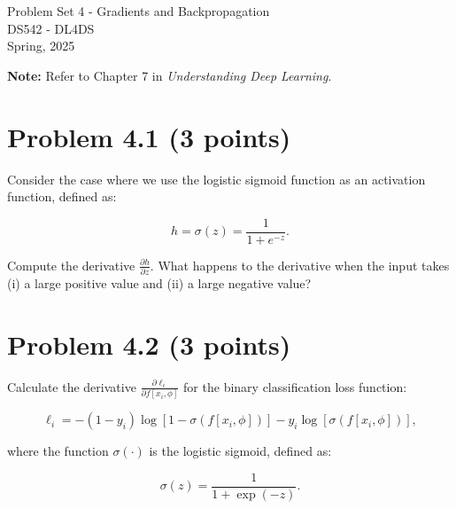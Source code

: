\documentclass[10pt]{article}
\begin{document}
\begin{center}
    \LARGE {Problem Set 4 - Gradients and Backpropagation} \\[1em]
    \Large{DS542 - DL4DS} \\[0.5em]
    \large Spring, 2025
\end{center}

\vspace{2em}

\noindent\textbf{Note:} Refer to Chapter 7 in \textit{Understanding Deep Learning}.

\vspace{2em}

\section*{Problem 4.1 (3 points)}

Consider the case where we use the logistic sigmoid function as an activation function, defined as:

\begin{equation}
h = \sigma(z) = \frac{1}{1 + e^{-z}}.
\end{equation}

\noindent Compute the derivative \( \frac{\partial h}{\partial z} \). What happens
to the derivative when the input takes (i) a large positive value and (ii) a large negative value?

\vspace{5em}

\section*{Problem 4.2 (3 points)}

Calculate the derivative \( \frac{\partial \ell_i}{\partial f[x_i, \phi]} \) for the binary 
classification loss function:

\begin{equation}
\ell_i = -(1 - y_i) \log [1 - \sigma(f[x_i, \phi])] - y_i \log [\sigma(f[x_i, \phi])],
\end{equation}

where the function \( \sigma(\cdot) \) is the logistic sigmoid, defined as:

\begin{equation}
\sigma(z) = \frac{1}{1 + \exp(-z)}.
\end{equation}

\vspace{5em}
\end{document}
